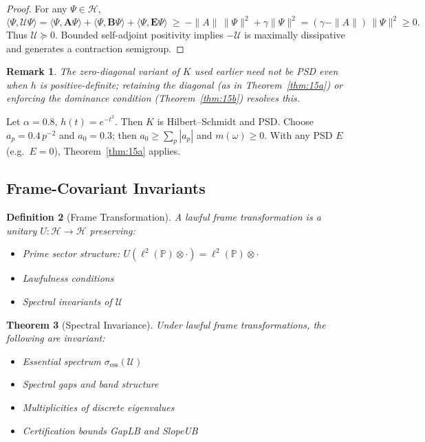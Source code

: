 \documentclass[10pt]{article}
\newtheorem{theorem}{Theorem}
\newtheorem{definition}[theorem]{Definition}
\newtheorem{remark}[theorem]{Remark}
\DeclareMathOperator{\ess}{ess}
\newcommand{\PP}{\mathbb{P}}
\newcommand{\HH}{\mathcal{H}}
\newcommand{\UU}{\mathcal{U}}
\begin{document}
\begin{proof}
For any \(\Psi\in\mathcal H\),
\[
\langle \Psi,\mathcal U \Psi\rangle
= \langle \Psi,\mathbf A \Psi\rangle
 + \langle \Psi,\mathbf B \Psi\rangle
 + \langle \Psi,\mathbf E \Psi\rangle
\ \ge\ -\|A\|\,\|\Psi\|^2 + \gamma \|\Psi\|^2
= (\gamma-\|A\|)\,\|\Psi\|^2 \ge 0.
\]
Thus \(\mathcal U\succeq 0\).
Bounded self-adjoint positivity implies \(-\mathcal U\) is maximally dissipative and generates a contraction semigroup.
\end{proof}

\begin{remark}
The zero-diagonal variant of \(K\) used earlier need not be PSD even when \(h\) is positive-definite; retaining the diagonal (as in Theorem~\ref{thm:15a}) or enforcing the dominance condition (Theorem~\ref{thm:15b}) resolves this.
\end{remark}

\begin{example}
Let \(\alpha=0.8\), \(h(t)=e^{-t^2}\). Then \(K\) is Hilbert–Schmidt and PSD.
Choose \(a_p=0.4\,p^{-2}\) and \(a_0=0.3\); then \(a_0\ge\sum_p|a_p|\) and \(m(\omega)\ge 0\).
With any PSD \(E\) (e.g.\ \(E=0\)), Theorem~\ref{thm:15a} applies.
\end{example}

\subsection{Frame-Covariant Invariants}

\begin{definition}[Frame Transformation]
A \emph{lawful frame transformation} is a unitary $U: \HH \to \HH$ preserving:
\begin{itemize}
    \item Prime sector structure: $U(\ell^2(\PP) \otimes \cdot) = \ell^2(\PP) \otimes \cdot$
    \item Lawfulness conditions
    \item Spectral invariants of $\UU$
\end{itemize}
\end{definition}

\begin{theorem}[Spectral Invariance]
Under lawful frame transformations, the following are invariant:
\begin{itemize}
    \item Essential spectrum $\sigma_{\ess}(\UU)$
    \item Spectral gaps and band structure  
    \item Multiplicities of discrete eigenvalues
    \item Certification bounds GapLB and SlopeUB
\end{itemize}
\end{theorem}
\end{document}
